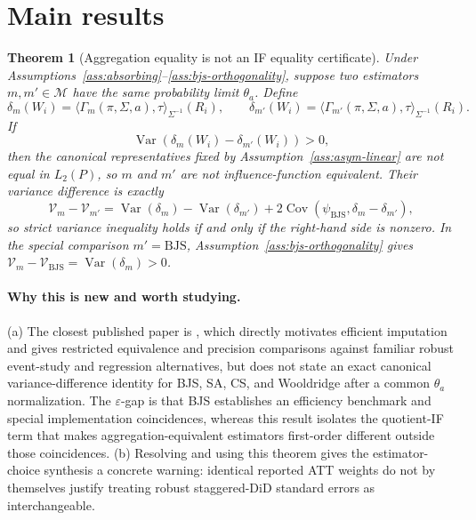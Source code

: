 \documentclass[11pt]{article}
\theoremstyle{definition}
\theoremstyle{plain}
\newtheorem{theorem}{Theorem}
\theoremstyle{remark}
\begin{document}
\section{Main results}
\begin{theorem}[Aggregation equality is not an IF equality certificate]\label{thm:aggregation-not-if}
Under Assumptions~\ref{ass:absorbing}--\ref{ass:bjs-orthogonality}, suppose two estimators
\(m,m'\in\mathcal M\) have the same probability limit \(\theta_a\).  Define
\[
  \delta_m(W_i)=\langle \Gamma_m(\pi,\Sigma,a),\tau\rangle_{\Sigma^{-1}}(R_i),
  \qquad
  \delta_{m'}(W_i)=\langle \Gamma_{m'}(\pi,\Sigma,a),\tau\rangle_{\Sigma^{-1}}(R_i).
\]
If
\[
  \operatorname{Var}\!\left(
    \delta_m(W_i)-\delta_{m'}(W_i)
  \right)>0,
\]
then the canonical representatives fixed by Assumption~\ref{ass:asym-linear} are not equal in
\(L_2(P)\), so \(m\) and \(m'\) are not influence-function equivalent.  Their variance difference is exactly
\[
  \mathcal V_m-\mathcal V_{m'}
    =\operatorname{Var}(\delta_m)-\operatorname{Var}(\delta_{m'})
      +2\operatorname{Cov}\!\left(\psi_{\mathrm{BJS}},\delta_m-\delta_{m'}\right),
\]
so strict variance inequality holds if and only if the right-hand side is nonzero.  In the special
comparison \(m'=\mathrm{BJS}\), Assumption~\ref{ass:bjs-orthogonality} gives
\(\mathcal V_m-\mathcal V_{\mathrm{BJS}}=\operatorname{Var}(\delta_m)>0\).
\end{theorem}
\paragraph{Why this is new and worth studying.}
(a) The closest published paper is \citet{BorusyakJaravelSpiess2024}, which directly motivates
efficient imputation and gives restricted equivalence and precision comparisons against familiar
robust event-study and regression alternatives, but does not state an exact canonical
variance-difference identity for BJS, SA, CS, and Wooldridge after a common \(\theta_a\)
normalization.  The \(\varepsilon\)-gap is that BJS establishes an efficiency benchmark and special
implementation coincidences, whereas this result isolates the quotient-IF term that makes
aggregation-equivalent estimators first-order different outside those coincidences.  (b) Resolving
and using this theorem gives the
\citet{RothSantAnnaBilinskiPoe2023} estimator-choice synthesis a concrete warning: identical reported
ATT weights do not by themselves justify treating robust staggered-DiD standard errors as
interchangeable.
\end{document}
